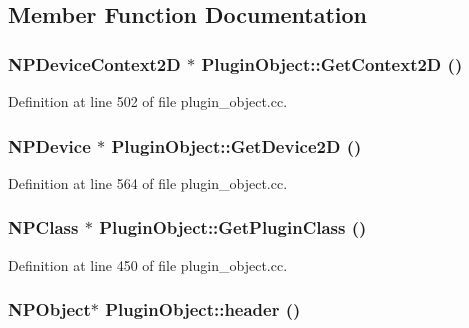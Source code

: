 \subsection{Member Function Documentation}
\hypertarget{class_plugin_object_ad121e4145b1f1cdcf878208919859e31}{
\subsubsection[{GetContext2D}]{\setlength{\rightskip}{0pt plus 5cm}NPDeviceContext2D $\ast$ PluginObject::GetContext2D ()}}
\label{class_plugin_object_ad121e4145b1f1cdcf878208919859e31}


Definition at line 502 of file plugin\_\-object.cc.

\hypertarget{class_plugin_object_a0678b6675237f65d7679a400759b5c29}{
\subsubsection[{GetDevice2D}]{\setlength{\rightskip}{0pt plus 5cm}NPDevice $\ast$ PluginObject::GetDevice2D ()}}
\label{class_plugin_object_a0678b6675237f65d7679a400759b5c29}


Definition at line 564 of file plugin\_\-object.cc.

\hypertarget{class_plugin_object_a4b017230102036f1626af06df4864a95}{
\subsubsection[{GetPluginClass}]{\setlength{\rightskip}{0pt plus 5cm}NPClass $\ast$ PluginObject::GetPluginClass ()}}
\label{class_plugin_object_a4b017230102036f1626af06df4864a95}


Definition at line 450 of file plugin\_\-object.cc.

\hypertarget{class_plugin_object_ac551056ed0941b76c4161ba71e4cf449}{
\subsubsection[{header}]{\setlength{\rightskip}{0pt plus 5cm}NPObject$\ast$ PluginObject::header ()}}
\label{class_plugin_object_ac551056ed0941b76c4161ba71e4cf449}


